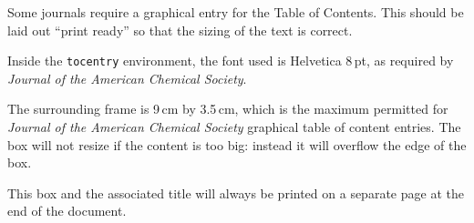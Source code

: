\documentclass[journal=jacsat,manuscript=article]{achemso}
\begin{document}
\begin{tocentry}

Some journals require a graphical entry for the Table of Contents.
This should be laid out ``print ready'' so that the sizing of the
text is correct.

Inside the \texttt{tocentry} environment, the font used is Helvetica
8\,pt, as required by \emph{Journal of the American Chemical
Society}.

The surrounding frame is 9\,cm by 3.5\,cm, which is the maximum
permitted for  \emph{Journal of the American Chemical Society}
graphical table of content entries. The box will not resize if the
content is too big: instead it will overflow the edge of the box.

This box and the associated title will always be printed on a
separate page at the end of the document.

\end{tocentry}
\end{document}
